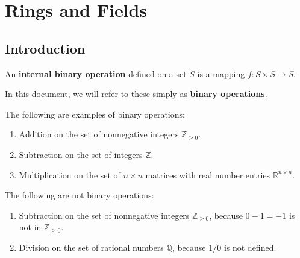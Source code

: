 \documentclass{scrartcl}
\begin{document}
\section{Rings and Fields}

\subsection{Introduction}

\begin{definition}
    \label{def:binary operation}
    \newcommand{\Q}{\mathbb{Q}}
    \newcommand{\R}{\mathbb{R}}
    \newcommand{\Z}{\mathbb{Z}}
    An \textbf{internal binary operation} defined on a set $S$ is a mapping $f:S\times S\to S$.

    In this document, we will refer to these simply as \textbf{binary operations}.

    The following are examples of binary operations:
    \begin{enumerate}
        \item Addition on the set of nonnegative integers $\Z_{\geq 0}$.
        \item Subtraction on the set of integers $\Z$.
        \item Multiplication on the set of $n\times n$ matrices with real number entries $\R^{n\times n}$.
    \end{enumerate}

    The following are not binary operations:
    \begin{enumerate}
        \item Subtraction on the set of nonnegative integers $\Z_{\geq 0}$, because $0-1=-1$ is not in $\Z_{\geq 0}$.
        \item Division on the set of rational numbers $\Q$, because $1/0$ is not defined.
    \end{enumerate}
\end{definition}
\end{document}
